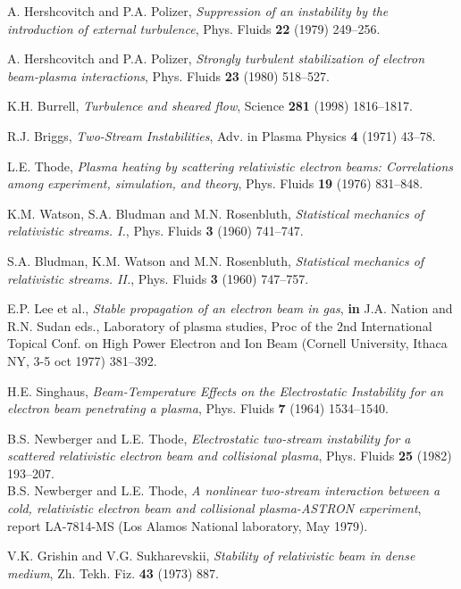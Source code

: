 \documentclass [12pt,a4paper,     ]{report} %
\begin{document}
\begin{enumerate}
 A. Hershcovitch and P.A. Polizer, \emph{Suppression of an instability by the introduction of external turbulence}, Phys. Fluids {\bf 22} (1979) 249--256.

 A. Hershcovitch and P.A. Polizer, \emph{Strongly turbulent stabilization of electron beam-plasma interactions}, Phys. Fluids {\bf 23} (1980) 518--527.


 K.H. Burrell, \emph{Turbulence and sheared flow}, Science {\bf 281} (1998) 1816--1817.

 R.J. Briggs, \emph{Two-Stream Instabilities}, Adv. in Plasma Physics {\bf 4} (1971) 43--78.
 
 L.E. Thode, \emph{Plasma heating by scattering relativistic electron beams: Correlations among experiment, simulation, and theory}, Phys. Fluids {\bf 19} (1976) 831--848.

  K.M. Watson,  S.A. Bludman and M.N. Rosenbluth, \emph{Statistical mechanics of relativistic streams. I.},  Phys. Fluids {\bf 3} (1960) 741--747.

  S.A. Bludman, K.M. Watson and M.N. Rosenbluth, \emph{Statistical mechanics of relativistic streams. II.},  Phys. Fluids {\bf 3} (1960) 747--757.

 E.P. Lee et al., \emph{Stable propagation of an electron beam in gas}, {\bf in} J.A. Nation and R.N. Sudan eds., Laboratory of plasma studies, Proc of the 2nd International Topical Conf. on High Power Electron and Ion Beam (Cornell University, Ithaca NY, 3-5 oct 1977) 381--392.

 H.E. Singhaus, \emph{Beam-Temperature Effects on the Electrostatic Instability for an electron beam penetrating a plasma}, Phys. Fluids {\bf 7} (1964) 1534--1540.

 B.S. Newberger and L.E. Thode, \emph{Electrostatic two-stream instability for a scattered relativistic electron beam and collisional plasma}, Phys. Fluids {\bf 25} (1982) 193--207.\\
         B.S. Newberger and L.E. Thode, \emph{A nonlinear two-stream interaction between a cold, relativistic electron beam and collisional plasma-ASTRON experiment}, report LA-7814-MS (Los Alamos National laboratory, May 1979).

 V.K. Grishin and V.G. Sukharevskii, \emph{Stability of relativistic beam in dense medium}, Zh. Tekh. Fiz. {\bf 43} (1973) 887.


\end{enumerate}
\end{document}
